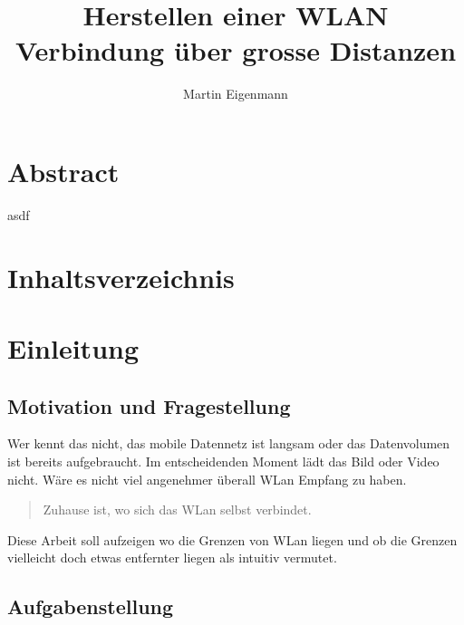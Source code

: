 \documentclass[oneside,11pt,parskip=half,ngerman]{scrreprt}
\title{\bigskip \bigskip Herstellen einer WLAN Verbindung über grosse Distanzen}
\author{Martin Eigenmann}
\begin{document}
  
\maketitle


\chapter{Abstract}\label{abstract}

asdf

\setcounter{tocdepth}{1}

\chapter{Inhaltsverzeichnis}\label{inhaltsverzeichnis}

\renewcommand{\contentsname}{} 

\begingroup\let\clearpage\relax
\tableofcontents
\endgroup


\newpage


\chapter{Einleitung}\label{einleitung}

\section{Motivation und
Fragestellung}\label{motivation-und-fragestellung}

Wer kennt das nicht, das mobile Datennetz ist langsam oder das
Datenvolumen ist bereits aufgebraucht. Im entscheidenden Moment lädt das
Bild oder Video nicht. Wäre es nicht viel angenehmer überall WLan
Empfang zu haben.

\begin{quote}
Zuhause ist, wo sich das WLan selbst verbindet.
\end{quote}

Diese Arbeit soll aufzeigen wo die Grenzen von WLan liegen und ob die
Grenzen vielleicht doch etwas entfernter liegen als intuitiv vermutet.

\section{Aufgabenstellung}\label{aufgabenstellung}
\end{document}
